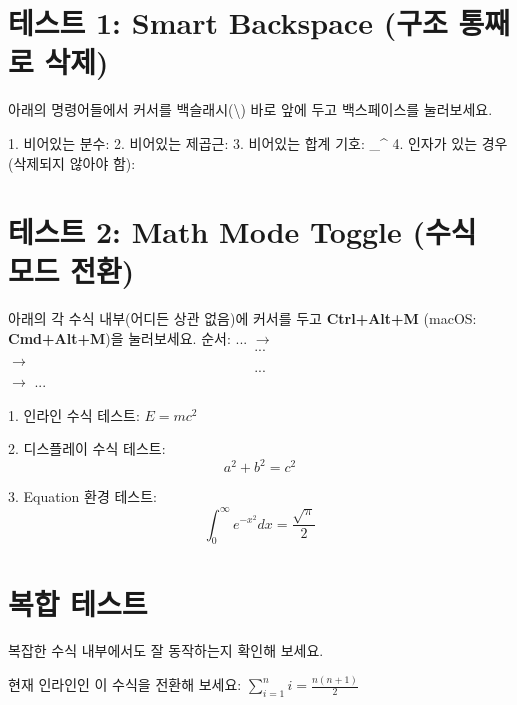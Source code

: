 \documentclass{article}
\begin{document}
\section{테스트 1: Smart Backspace (구조 통째로 삭제)}
아래의 명령어들에서 커서를 백슬래시(\textbackslash) 바로 앞에 두고 백스페이스를 눌러보세요.

1. 비어있는 분수: \frac{}{}  %
2. 비어있는 제곱근: \sqrt{}   %
3. 비어있는 합계 기호: \sum_{}^{} %
4. 인자가 있는 경우 (삭제되지 않아야 함):  %

\section{테스트 2: Math Mode Toggle (수식 모드 전환)}
아래의 각 수식 내부(어디든 상관 없음)에 커서를 두고 \textbf{Ctrl+Alt+M} (macOS: \textbf{Cmd+Alt+M})을 눌러보세요.
순서: $ ... $ $\rightarrow$ \[ ... \] $\rightarrow$ \begin{equation} ... \end{equation} $\rightarrow$ $ ... $

1. 인라인 수식 테스트: $E = mc^2$

2. 디스플레이 수식 테스트:
\[
    a^2 + b^2 = c^2
\]

3. Equation 환경 테스트:
\begin{equation}
    \int_{0}^{\infty} e^{-x^2} dx = \frac{\sqrt{\pi}}{2}
\end{equation}

\section{복합 테스트}
복잡한 수식 내부에서도 잘 동작하는지 확인해 보세요.

$ \text{현재 인라인인 이 수식을 전환해 보세요: } \sum_{i=1}^{n} i = \frac{n(n+1)}{2} $
\end{document}
